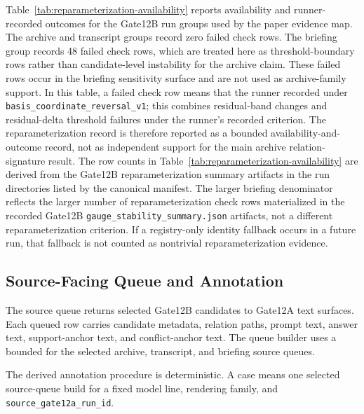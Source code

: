 \documentclass[11pt]{article}
\newcommand{\code}[1]{\texttt{\detokenize{#1}}}
\newcommand{\breakcode}[1]{\begingroup\urlstyle{tt}\nolinkurl{#1}\endgroup}
\begin{document}
Table~\ref{tab:reparameterization-availability} reports availability and
runner-recorded outcomes for the Gate12B run groups used by the paper evidence
map. The archive and transcript groups record zero failed check rows. The
briefing group records 48 failed check rows, which are treated here as
threshold-boundary rows rather than candidate-level instability for the archive
claim. These failed rows occur in the briefing sensitivity surface and are not
used as archive-family support. In this table, a failed check row means that
the runner recorded \code{stable=false} under
\breakcode{basis_coordinate_reversal_v1}; this combines residual-band changes
and residual-delta threshold failures under the runner's recorded criterion.
The reparameterization record is therefore reported as a bounded
availability-and-outcome record, not as independent support for the main
archive relation-signature result.
The row counts in Table~\ref{tab:reparameterization-availability} are derived
from the Gate12B reparameterization summary artifacts in the run directories
listed by the canonical manifest. The larger briefing denominator reflects the
larger number of reparameterization check rows materialized in the recorded
Gate12B \breakcode{gauge_stability_summary.json} artifacts, not a different
reparameterization criterion. If a registry-only identity fallback occurs
in a future run, that fallback is not counted as nontrivial reparameterization
evidence.

\subsection{Source-Facing Queue and Annotation}

The source queue returns selected Gate12B candidates to Gate12A text surfaces.
Each queued row carries candidate metadata, relation paths, prompt text,
answer text, support-anchor text, and conflict-anchor text. The queue builder
uses a bounded \code{per_band_limit=2} for the selected archive,
transcript, and briefing source queues.

The derived annotation procedure is deterministic. A case means one selected
source-queue build for a fixed model line, rendering family, and
\breakcode{source_gate12a_run_id}.
\end{document}
